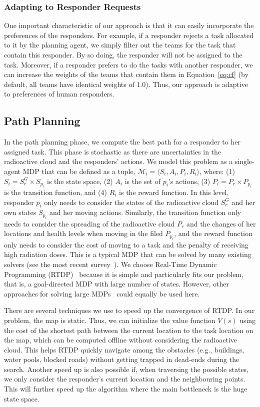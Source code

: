 \subsubsection{Adapting to Responder Requests}\label{sec:adaptive}
\noindent One important characteristic of our approach is that it can easily
incorporate the preferences of the responders. For example, if a
responder rejects a task allocated to it by the planning agent, we
simply filter out the teams for the task that contain this
responder. By so doing, the responder will not be assigned to the
task. Moreover, if a responder prefers to do the tasks with another
responder, we can increase the weights of the teams that
contain them in Equation~\ref{eq:cf} (by default, all teams
have identical weights of 1.0). Thus, our approach is adaptive to
 preferences of human responders.

\subsection{Path Planning}
\label{sec:pathplanning}

\noindent In the path planning phase, we compute the best path for
a responder to her assigned task. This phase is stochastic as there
are uncertainties in the radioactive cloud and the responders'
actions. We model this problem as a single-agent MDP that can be
defined as a tuple, $\mathcal{M}_i = \langle S_i, A_i, P_i, R_i
\rangle$, where: (1) $S_i = S^G_r \times S_{p_i}$ is the state
space, (2) $A_i$ is the set of $p_i$'s actions, (3) $P_i = P_r
\times P_{p_i}$ is the transition function, and (4) $R_i$ is the
reward function. In this level, responder $p_i$ only needs to
consider the states of the radioactive cloud $S^G_r$ and her own
states $S_{p_i}$ and her moving actions. Similarly, the transition
function only needs to consider the spreading of the radioactive
cloud $P_r$ and the changes of her locations and health levels when
moving in the filed $P_{p_i}$, and the reward function only needs
to consider the cost of moving to a task and the penalty of
receiving high radiation doses. This is a typical MDP that can be
solved by many existing solvers (see the most recent
survey~\cite{kolobov2012planning}). We choose Real-Time Dynamic
Programming (RTDP)~\cite{barto1995learning} because it is simple
and particularly fits our problem, that is, a goal-directed MDP
with large number of states. However, other approaches for solving
large MDPs~\cite{kolobov2012planning} could equally be used here.

There are several techniques we use to speed up the convergence of
RTDP. In our problem, the map is static. Thus, we can initialize
the value function $V(s)$ using the cost of the shortest path
between the current location to the task location on the map, which
can be computed offline without considering the radioactive cloud.
This helps RTDP quickly navigate among the obstacles (e.g.,
buildings, water pools, blocked roads) without getting trapped in
dead-ends during the search. Another speed up is also possible if,
when traversing the possible states, we only consider the
responder's current location and the neighbouring points. This will
further speed up the algorithm where the main bottleneck is the
huge state space.

